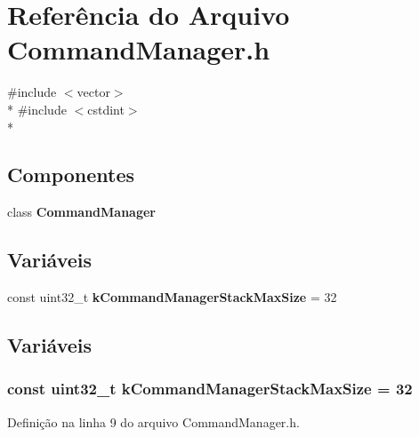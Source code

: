 \section{Referência do Arquivo Command\+Manager.\+h}
\label{_command_manager_8h}
{\ttfamily \#include $<$vector$>$}\\*
{\ttfamily \#include $<$cstdint$>$}\\*
\subsection*{Componentes}
\begin{DoxyCompactItemize}
\item 
class {\bf Command\+Manager}
\end{DoxyCompactItemize}
\subsection*{Variáveis}
\begin{DoxyCompactItemize}
\item 
const uint32\+\_\+t {\bf k\+Command\+Manager\+Stack\+Max\+Size} = 32
\end{DoxyCompactItemize}


\subsection{Variáveis}
\subsubsection[{k\+Command\+Manager\+Stack\+Max\+Size}]{\setlength{\rightskip}{0pt plus 5cm}const uint32\+\_\+t k\+Command\+Manager\+Stack\+Max\+Size = 32}\label{_command_manager_8h_a7b4fec5ddcfb824b8c600bb109fb0487}


Definição na linha 9 do arquivo Command\+Manager.\+h.

